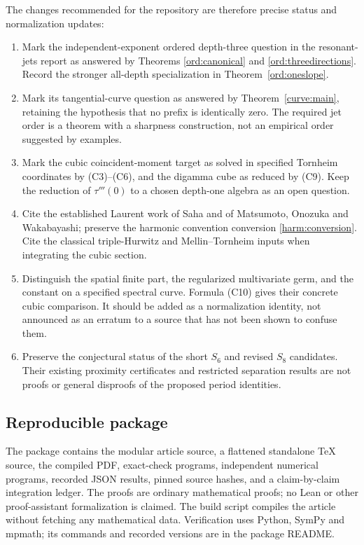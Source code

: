 \documentclass[11pt,letterpaper]{article}
\numberwithin{equation}{section}
\theoremstyle{definition}
\theoremstyle{remark}
\begin{document}
The changes recommended for the repository are therefore precise
status and normalization updates:
\begin{enumerate}[leftmargin=*,itemsep=4pt]
\item Mark the independent-exponent ordered depth-three question in
the resonant-jets report as answered by Theorems
\ref{ord:canonical} and \ref{ord:threedirections}. Record the stronger
all-depth specialization in Theorem~\ref{ord:oneslope}.
\item Mark its tangential-curve question as answered by
Theorem~\ref{curve:main}, retaining the hypothesis that no prefix is
identically zero. The required jet order is a theorem with a sharpness
construction, not an empirical order suggested by examples.
\item Mark the cubic coincident-moment target as solved in specified
Tornheim coordinates by (C3)--(C6), and the digamma cube as reduced by
(C9). Keep the reduction of $\tau'''(0)$ to a chosen depth-one algebra
as an open question.
\item Cite the established Laurent work of Saha and of Matsumoto,
Onozuka and Wakabayashi; preserve the harmonic convention conversion
\eqref{harm:conversion}. Cite the classical triple-Hurwitz and
Mellin--Tornheim inputs when integrating the cubic section.
\item Distinguish the spatial finite part, the regularized
multivariate germ, and the constant on a specified spectral curve.
Formula (C10) gives their concrete cubic comparison. It should be
added as a normalization identity, not announced as an erratum to a
source that has not been shown to confuse them.
\item Preserve the conjectural status of the short $S_6$ and revised
$S_8$ candidates. Their existing proximity certificates and restricted
separation results are not proofs or general disproofs of the proposed
period identities.
\end{enumerate}

\subsection{Reproducible package}

The package contains the modular article source, a flattened
standalone TeX source, the compiled PDF, exact-check programs,
independent numerical programs, recorded JSON results, pinned source
hashes, and a claim-by-claim integration ledger. The proofs are
ordinary mathematical proofs; no Lean or other proof-assistant
formalization is claimed. The build script compiles the article
without fetching any mathematical data. Verification uses Python,
SymPy and mpmath; its commands and recorded versions are in the
package README.
\end{document}
